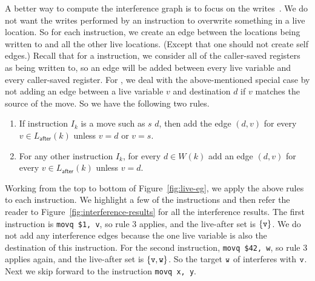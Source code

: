\documentclass[11pt]{book}
\begin{document}
A better way to compute the interference graph is to focus on the
writes~\cite{Appel:2003fk}. We do not want the writes performed by an
instruction to overwrite something in a live location. So for each
instruction, we create an edge between the locations being written to
and all the other live locations. (Except that one should not create
self edges.)  Recall that for a  instruction, we consider
all of the caller-saved registers as being written to, so an edge will
be added between every live variable and every caller-saved
register. For , we deal with the above-mentioned special
case by not adding an edge between a live variable $v$ and destination
$d$ if $v$ matches the source of the move. So we have the following
two rules.

\begin{enumerate}
\item If instruction $I_k$ is a move such as  $s$\key{,}
  $d$, then add the edge $(d,v)$ for every $v \in
  L_{\mathsf{after}}(k)$ unless $v = d$ or $v = s$.

\item For any other instruction $I_k$, for every $d \in W(k)$
  add an edge $(d,v)$ for every $v \in L_{\mathsf{after}}(k)$ unless $v = d$.
  

\end{enumerate}

Working from the top to bottom of Figure~\ref{fig:live-eg}, we apply
the above rules to each instruction. We highlight a few of the
instructions and then refer the reader to
Figure~\ref{fig:interference-results} for all the interference
results.  The first instruction is \lstinline{movq $1, v}, so rule 3
applies, and the live-after set is $\{\mathtt{v}\}$. We do not add any
interference edges because the one live variable  is also the
destination of this instruction.
%
For the second instruction, \lstinline{movq $42, w}, so rule 3 applies
again, and the live-after set is $\{\mathtt{v},\mathtt{w}\}$. So the target
$\mathtt{w}$ of  interferes with $\mathtt{v}$.
%
Next we skip forward to the instruction \lstinline{movq x, y}.
\end{document}
